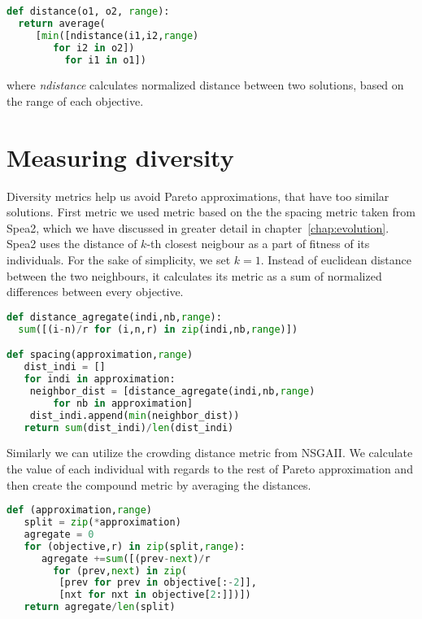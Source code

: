 \documentclass[12pt,oneside]{fithesis2}
\begin{document}
\begin{lstlisting}[language=Python,label=eps_example,caption=Distance indicator implementation]
def distance(o1, o2, range):
  return average(
     [min([ndistance(i1,i2,range) 
        for i2 in o2])
          for i1 in o1])
\end{lstlisting}

where \emph{ndistance} calculates normalized distance between two solutions, based on the range of each objective.

\section{Measuring diversity}
Diversity metrics help us avoid Pareto approximations, that have too similar solutions. First metric we used metric based on the the spacing metric taken from Spea2, which we have discussed in greater detail in chapter~\ref{chap:evolution}. Spea2 uses the distance of $k$-th closest neigbour as a part of fitness of its individuals. For the sake of simplicity, we set $k=1$. Instead of euclidean distance between the two neighbours, it calculates its metric as a sum of normalized differences between every objective. 

\begin{lstlisting}[language=Python,label=space_example,caption=Spacing indicator implementation]
def distance_agregate(indi,nb,range):
  sum([(i-n)/r for (i,n,r) in zip(indi,nb,range)])

def spacing(approximation,range)
   dist_indi = []
   for indi in approximation:
	neighbor_dist = [distance_agregate(indi,nb,range) 
		for nb in approximation]
	dist_indi.append(min(neighbor_dist))
   return sum(dist_indi)/len(dist_indi)
\end{lstlisting}

Similarly we can utilize the crowding distance metric from NSGAII. We calculate the value of each individual with regards to the rest of Pareto approximation and then create the compound metric by averaging the distances.

\begin{lstlisting}[language=Python,label=space_example,caption=Spacing indicator implementation]
def (approximation,range)
   split = zip(*approximation)
   agregate = 0
   for (objective,r) in zip(split,range):
      agregate +=sum([(prev-next)/r 
        for (prev,next) in zip(
         [prev for prev in objective[:-2]],
         [nxt for nxt in objective[2:]])])
   return agregate/len(split)
\end{lstlisting}
\end{document}
